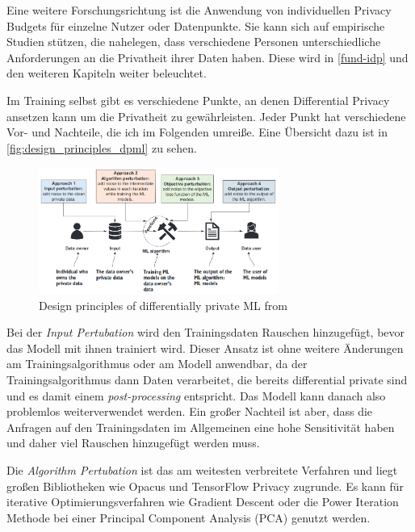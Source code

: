 Eine weitere Forschungsrichtung ist die Anwendung von individuellen Privacy Budgets für einzelne Nutzer oder Datenpunkte. Sie kann sich auf empirische Studien stützen, die nahelegen, dass verschiedene Personen unterschiedliche Anforderungen an die Privatheit ihrer Daten haben\cite{jensen:2005, acquisti:2005}. Diese wird in \autoref{fund-idp} und den weiteren Kapiteln weiter beleuchtet.

Im Training selbst gibt es verschiedene Punkte, an denen Differential Privacy ansetzen kann um die Privatheit zu gewährleisten. Jeder Punkt hat verschiedene Vor- und Nachteile, die ich im Folgenden umreiße. Eine Übersicht dazu ist in \autoref{fig:design_principles_dpml} zu sehen.

\begin{figure}[tb]
	\centering
	\includegraphics[width=0.7\textwidth]{Bilder/design_principles_dpml.png}
	\caption{Design principles of differentially private ML from \textcite{chang:2023}}
	\label{fig:design_principles_dpml}
\end{figure}

Bei der \textit{Input Pertubation} wird den Trainingsdaten Rauschen hinzugefügt, bevor das Modell mit ihnen trainiert wird. Dieser Ansatz ist ohne weitere Änderungen am Trainingsalgorithmus oder am Modell anwendbar, da der Trainingsalgorithmus dann Daten verarbeitet, die bereits differential private sind und es damit einem \textit{post-processing} entspricht. Das Modell kann danach also problemlos weiterverwendet werden. Ein großer Nachteil ist aber, dass die Anfragen auf den Trainingsdaten im Allgemeinen eine hohe Sensitivität haben und daher viel Rauschen hinzugefügt werden muss.

Die \textit{Algorithm Pertubation} ist das am weitesten verbreitete Verfahren und liegt großen Bibliotheken wie Opacus\cite{yousefpour:2021} und TensorFlow Privacy\cite{tfprivacy} zugrunde. Es kann für iterative Optimierungsverfahren wie Gradient Descent oder die Power Iteration Methode bei einer Principal Component Analysis (PCA) genutzt werden. 

